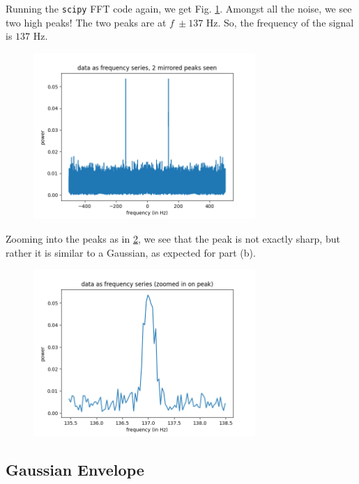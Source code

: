 \documentclass{article}
\begin{document}
Running the \texttt{scipy} FFT code again, we get Fig. \ref{fig:arecibo_freq}. Amongst all the noise, we see two high peaks! The two peaks are at $f ~ \pm 137$ Hz. So, the frequency of the signal is $137$ Hz.

\begin{figure}[h!]
\centering
\includegraphics[width=0.75\textwidth]{plots/arecibo_freq.png}
\caption{\label{fig:arecibo_freq}  }
\end{figure}

Zooming into the peaks as in \ref{fig:arecibo_freq_zoom}, we see that the peak is not exactly sharp, but rather it is similar to a Gaussian, as expected for part (b).

\begin{figure}[h!]
\centering
\includegraphics[width=0.75\textwidth]{plots/arecibo_freq_zoom.png}
\caption{\label{fig:arecibo_freq_zoom}  }
\end{figure}

\subsection{Gaussian Envelope}
\end{document}
